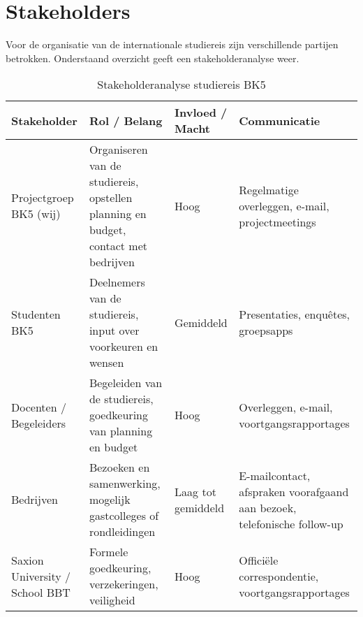 \section{Stakeholders}

Voor de organisatie van de internationale studiereis zijn verschillende partijen betrokken. Onderstaand overzicht geeft een stakeholderanalyse weer.

\begin{table}[h!]
	\centering
	\caption{Stakeholderanalyse studiereis BK5}
	\label{tab:stakeholders}
	\begin{tabular}{|l|p{4.5cm}|l|p{4.5cm}|}
		\hline
		\textbf{Stakeholder} & \textbf{Rol / Belang} & \textbf{Invloed / Macht} & \textbf{Communicatie} \\
		\hline
		Projectgroep BK5 (wij) & Organiseren van de studiereis, opstellen planning en budget, contact met bedrijven & Hoog & Regelmatige overleggen, e-mail, projectmeetings \\
		\hline
		Studenten BK5 & Deelnemers van de studiereis, input over voorkeuren en wensen & Gemiddeld & Presentaties, enquêtes, groepsapps \\
		\hline
		Docenten / Begeleiders & Begeleiden van de studiereis, goedkeuring van planning en budget & Hoog & Overleggen, e-mail, voortgangsrapportages \\
		\hline
		Bedrijven & Bezoeken en samenwerking, mogelijk gastcolleges of rondleidingen & Laag tot gemiddeld & E-mailcontact, afspraken voorafgaand aan bezoek, telefonische follow-up \\
		\hline
		Saxion University / School BBT & Formele goedkeuring, verzekeringen, veiligheid & Hoog & Officiële correspondentie, voortgangsrapportages \\
		\hline
	\end{tabular}
	
\end{table}